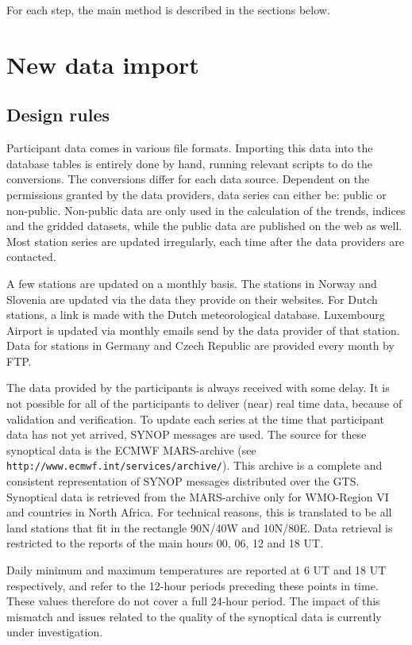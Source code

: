 \documentclass[a4paper,11pt]{article}
\begin{document}
For each step, the main method is described in the sections below. 


\section{New data import}
\subsection{Design rules}
\label{sec:data:design}

Participant data comes in various file formats. Importing this data
into the database tables is entirely done by hand, running relevant
scripts to do the conversions. The conversions differ for each data
source. Dependent on the permissions granted by the data providers,
data series can either be: public or non-public. Non-public data are
only used in the calculation of the trends, indices and the gridded
datasets, while the public data are published on the web as well. Most
station series are updated irregularly, each time after the data
providers are contacted.

A few stations are updated on a monthly basis. The stations in Norway
and Slovenia are updated via the data they provide on their
websites. For Dutch stations, a link is made with the Dutch
meteorological database. Luxembourg Airport is updated via monthly
emails send by the data provider of that station. Data for stations in
Germany and Czech Republic are provided every month by FTP.

The data provided by the participants is always received with some
delay. It is not possible for all of the participants to deliver
(near) real time data, because of validation and verification. To
update each series at the time that participant data has not yet
arrived, SYNOP messages are used. The source for these synoptical data
is the ECMWF MARS-archive (see
{\tt http://www.ecmwf.int/services/archive/}). This archive is a complete
and consistent representation of SYNOP messages distributed over the
GTS. Synoptical data is retrieved from the MARS-archive only for
WMO-Region VI and countries in North Africa. For technical reasons,
this is translated to be all land stations that fit in the rectangle
90N/40W and 10N/80E. Data retrieval is restricted to the reports of
the main hours 00, 06, 12 and 18 UT.

Daily minimum and maximum temperatures are reported at 6 UT and 18 UT 
respectively, and refer to the 12-hour periods preceding these points in time. 
These values therefore do not cover a full 24-hour period. 
The impact of this mismatch and issues related to the quality of the synoptical data
is currently under investigation.
\end{document}
